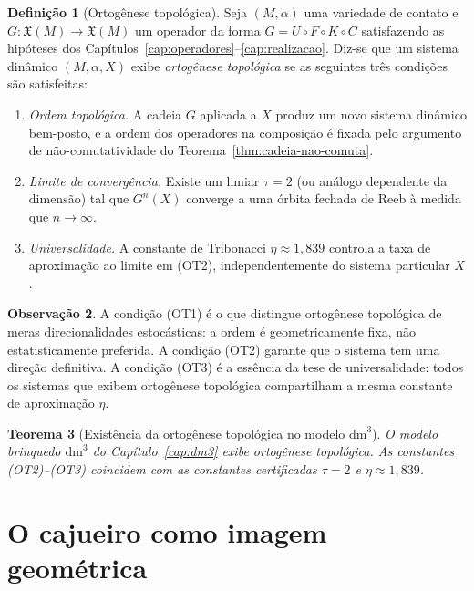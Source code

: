 \documentclass[12pt,a4paper,twoside]{book}
\theoremstyle{plain}
\newtheorem{teorema}{Teorema}[section]
\theoremstyle{definition}
\theoremstyle{definition}
\newtheorem{definicao}[teorema]{Definição}
\newtheorem{observacao}[teorema]{Observação}
\newcommand{\tribo}{\eta}
\newcommand{\dm}{\mathrm{dm}^{3}}
\begin{document}
\begin{definicao}[Ortogênese topológica]\label{def:ortogenese}
Seja $(M,\alpha)$ uma variedade de contato e $G : \mathfrak{X}(M) \to \mathfrak{X}(M)$
um operador da forma $G = U \circ F \circ K \circ C$ satisfazendo as
hipóteses dos Capítulos~\ref{cap:operadores}--\ref{cap:realizacao}.
Diz-se que um sistema dinâmico $(M,\alpha,X)$ exibe \emph{ortogênese
topológica} se as seguintes três condições são satisfeitas:
\begin{enumerate}[label=\textup{(OT\arabic*)}]
  \item \emph{Ordem topológica.} A cadeia $G$ aplicada a $X$ produz um
        novo sistema dinâmico bem-posto, e a ordem dos operadores na
        composição é fixada pelo argumento de não-comutatividade do
        Teorema~\ref{thm:cadeia-nao-comuta}.
  \item \emph{Limite de convergência.} Existe um limiar $\tau = 2$ (ou
        análogo dependente da dimensão) tal que $G^{n}(X)$ converge a uma
        órbita fechada de Reeb à medida que $n \to \infty$.
  \item \emph{Universalidade.} A constante de Tribonacci
        $\tribo \approx 1{,}839$ controla a taxa de aproximação ao limite
        em (OT2), independentemente do sistema particular $X$.
\end{enumerate}
\end{definicao}

\begin{observacao}
A condição (OT1) é o que distingue ortogênese topológica de meras
direcionalidades estocásticas: a ordem é geometricamente fixa, não
estatisticamente preferida. A condição (OT2) garante que o sistema tem
uma direção definitiva. A condição (OT3) é a essência da tese de
universalidade: todos os sistemas que exibem ortogênese topológica
compartilham a mesma constante de aproximação $\tribo$.
\end{observacao}

\begin{teorema}[Existência da ortogênese topológica no modelo $\dm$]
\label{thm:ortogenese-dm3}
O modelo brinquedo $\dm$ do Capítulo~\ref{cap:dm3} exibe ortogênese
topológica. As constantes (OT2)--(OT3) coincidem com as constantes
certificadas $\tau = 2$ e $\tribo \approx 1{,}839$.
\end{teorema}

\section{O cajueiro como imagem geométrica}
\end{document}
